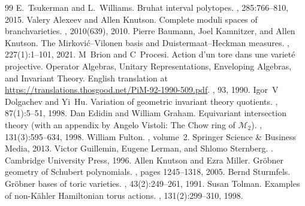 \documentclass[10pt,a4paper]{amsart}
\begin{document}
\begin{thebibliography}{99}
 E.~Tsukerman and L.~Williams. \newblock Bruhat interval polytopes. , 285:766--810, 2015.
 Valery Alexeev and Allen Knutson. \newblock Complete moduli spaces of branchvarieties. , 2010(639), 2010.
 Pierre Baumann, Joel Kamnitzer, and Allen Knutson. \newblock The {M}irkovi{\'c}--{V}ilonen basis and {D}uistermaat--{H}eckman measures. , 227(1):1--101, 2021.
 M~Brion and C~Procesi. \newblock Action d’un tore dans une variet{\'e} projective. {O}perator {A}lgebras, {U}nitary {R}epresentations, {E}nveloping {A}lgebras, and {I}nvariant {T}heory. {E}nglish translation at \url{https://translations.thosgood.net/PiM-92-1990-509.pdf}. , 93, 1990.
 Igor~V Dolgachev and Yi~Hu. \newblock Variation of geometric invariant theory quotients. , 87(1):5--51, 1998.
 Dan Edidin and William Graham. \newblock Equivariant intersection theory (with an appendix by {A}ngelo {V}istoli: The {C}how ring of {$\mathcal M_2$}). , 131(3):595--634, 1998.
 William Fulton. , volume~2. \newblock Springer Science \& Business Media, 2013.
 Victor Guillemin, Eugene Lerman, and Shlomo Sternberg. . \newblock Cambridge University Press, 1996.
 Allen Knutson and Ezra Miller. \newblock Gr{\"o}bner geometry of {S}chubert polynomials. , pages 1245--1318, 2005.
 Bernd Sturmfels. \newblock Gr{\"o}bner bases of toric varieties. , 43(2):249--261, 1991.
 Susan Tolman. \newblock Examples of non-{K\"a}hler {H}amiltonian torus actions. , 131(2):299--310, 1998.
\end{thebibliography}
\end{document}
